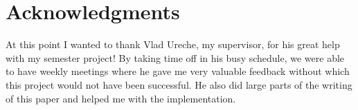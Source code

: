 \section{Acknowledgments}

At this point I wanted to thank Vlad Ureche, my supervisor, for his great help with my semester project! By taking time off in his busy schedule, we were able to have weekly meetings where he gave me very valuable feedback without which this project would not have been successful. He also did large parts of the writing of this paper and helped me with the implementation.